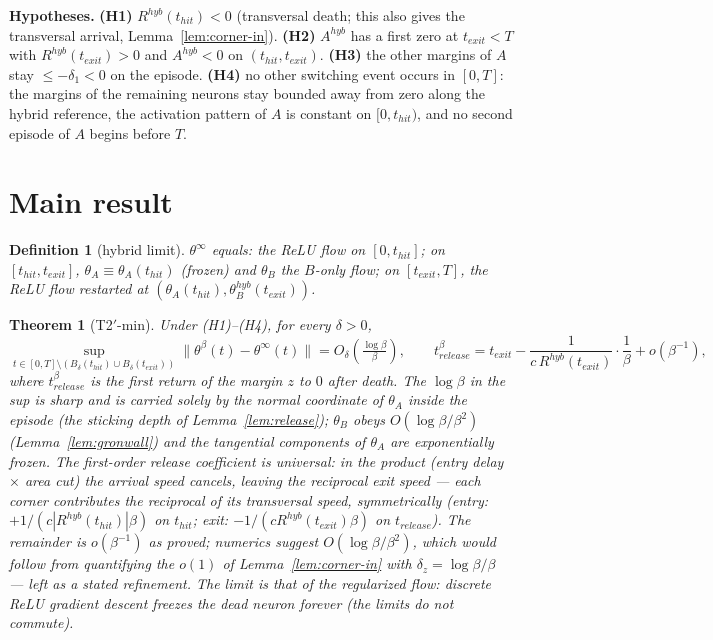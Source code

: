 \documentclass[11pt]{article}
\newtheorem{theorem}{Theorem}
\newtheorem{definition}{Definition}
\begin{document}
\smallskip\noindent\textbf{Hypotheses.}
\textbf{(H1)} $R^{hyb}(t_{hit})<0$ (transversal death; this also gives the
transversal arrival, Lemma~\ref{lem:corner-in}).
\textbf{(H2)} $A^{hyb}$ has a first zero at $t_{exit}<T$ with
$R^{hyb}(t_{exit})>0$ and $A^{hyb}<0$ on $(t_{hit},t_{exit})$.
\textbf{(H3)} the other margins of $A$ stay $\le-\delta_1<0$ on the episode.
\textbf{(H4)} no other switching event occurs in $[0,T]$: the margins of the
remaining neurons stay bounded away from zero along the hybrid reference, the
activation pattern of $A$ is constant on $[0,t_{hit})$, and no second episode
of $A$ begins before $T$.

\section{Main result}
\begin{definition}[hybrid limit]\label{def:hybrid}
$\theta^\infty$ equals: the ReLU flow on $[0,t_{hit}]$; on $[t_{hit},t_{exit}]$,
$\theta_A\equiv\theta_A(t_{hit})$ (frozen) and $\theta_B$ the $B$-only flow; on
$[t_{exit},T]$, the ReLU flow restarted at
$(\theta_A(t_{hit}),\theta_B^{hyb}(t_{exit}))$.
\end{definition}

\begin{theorem}[T2$'$-min]\label{thm:main}
Under (H1)--(H4), for every $\delta>0$,
\[
\sup_{t\in[0,T]\setminus(B_\delta(t_{hit})\cup B_\delta(t_{exit}))}
\|\theta^\beta(t)-\theta^\infty(t)\| = O_\delta\!\left(\tfrac{\log\beta}{\beta}\right),
\qquad
t^\beta_{release}=t_{exit}-\frac{1}{c\,R^{hyb}(t_{exit})}\cdot\frac{1}{\beta}
+o(\beta^{-1}),
\]
where $t^\beta_{release}$ is the first return of the margin $z$ to $0$ after
death. The $\log\beta$ in the sup is sharp and is carried solely by the normal
coordinate of $\theta_A$ inside the episode (the sticking depth of
Lemma~\ref{lem:release}); $\theta_B$ obeys $O(\log\beta/\beta^{2})$
(Lemma~\ref{lem:gronwall}) and the tangential components of $\theta_A$ are
exponentially frozen. The first-order release coefficient is \emph{universal}:
in the product (entry delay $\times$ area cut) the arrival speed cancels,
leaving the reciprocal exit speed --- each corner contributes the reciprocal of
its transversal speed, symmetrically (entry: $+1/(c|R^{hyb}(t_{hit})|\beta)$ on
$t_{hit}$; exit: $-1/(cR^{hyb}(t_{exit})\beta)$ on $t_{release}$). The remainder is
$o(\beta^{-1})$ as proved; numerics suggest $O(\log\beta/\beta^2)$, which would
follow from quantifying the $o(1)$ of Lemma~\ref{lem:corner-in} with
$\delta_z=\log\beta/\beta$ --- left as a stated refinement.
The limit is that of the regularized flow: discrete ReLU gradient descent
freezes the dead neuron forever (the limits do not commute).
\end{theorem}
\end{document}
